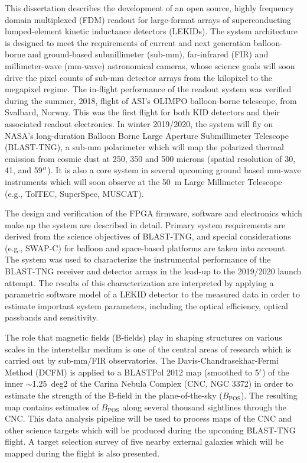 

This dissertation describes the development of an open source, highly frequency domain multiplexed (FDM) readout for large-format arrays of superconducting lumped-element kinetic inductance detectors (LEKIDs). The system architecture is designed to meet the requirements of current and next generation balloon-borne and ground-based submillimeter (sub-mm), far-infrared (FIR) and millimeter-wave (mm-wave) astronomical cameras, whose science goals will soon drive the pixel counts of sub-mm detector arrays from the kilopixel to the megapixel regime. The in-flight performance of the readout system was verified during the summer, 2018, flight of ASI's OLIMPO balloon-borne telescope, from Svalbard, Norway. This was the first flight for both KID detectors and their associated readout electronics. In winter 2019/2020, the system will fly on NASA's long-duration Balloon Borne Large Aperture Submillimeter Telescope (BLAST-TNG), a sub-mm polarimeter which will map the polarized thermal emission from cosmic dust at 250, 350 and 500 microns (spatial resolution of 30, 41, and 59$\operatorname{^{\prime\prime}}$). It is also a core system in several upcoming ground based mm-wave instruments which will soon observe at the 50~m Large Millimeter Telescope (e.g., TolTEC, SuperSpec, MUSCAT).

The design and verification of the FPGA firmware, software and electronics which make up the system are described in detail. Primary system requirements are derived from the science objectives of BLAST-TNG, and special considerations (e.g., SWAP-C) for balloon and space-based platforms are taken into account. The system was used to characterize the instrumental performance of the BLAST-TNG receiver and detector arrays in the lead-up to the 2019/2020 launch attempt. The results of this characterization are interpreted by applying a parametric software model of a LEKID detector to the measured data in order to estimate important system parameters, including the optical efficiency, optical passbands and sensitivity.

The role that magnetic fields (B-fields) play in shaping structures on various scales in the interstellar medium is one of the central areas of research which is carried out by sub-mm/FIR observatories. The Davis-Chandrasekhar-Fermi Method (DCFM) is applied to a BLASTPol 2012 map (smoothed to 5$\operatorname{^{\prime}}$) of the inner $\sim$1.25~deg${2}$ of the Carina Nebula Complex (CNC, NGC 3372) in order to estimate the strength of the B-field in the plane-of-the-sky ($B_{\mathrm{POS}}$). The resulting map contains estimates of $B_{\mathrm{POS}}$ along several thousand sightlines through the CNC. This data analysis pipeline will be used to process maps of the CNC and other science targets which will be produced during the upcoming BLAST-TNG flight. A target selection survey of five nearby external galaxies which will be mapped during the flight is also presented.

